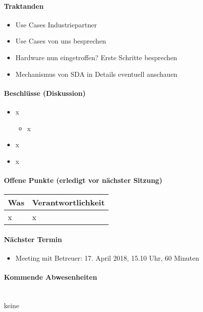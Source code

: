 \paragraph{Traktanden}
\begin{itemize}	
	\item Use Cases Industriepartner
	\item Use Cases von uns besprechen
	\item Hardware nun eingetroffen? Erste Schritte besprechen
	\item Mechanismus von SDA in Details eventuell anschauen
\end{itemize}

\paragraph{Beschlüsse (Diskussion)}
\begin{itemize}	
	\item x
	\begin{itemize}
		\item x
	\end{itemize}
	\item x
	\item x
\end{itemize}

\paragraph{Offene Punkte (erledigt vor nächster Sitzung)} \mbox{}

\begin{table}[H]
	\centering
	\begin{tabularx}{\textwidth}{X | p{4.5cm}}
		\rowcolor{gray!50}
		\textbf{Was} & \textbf{Verantwortlichkeit} \\
		\hline
		x & x \\	
	\end{tabularx}
	\label{tab:my-label}
\end{table}

\paragraph{Nächster Termin}
\begin{itemize}	
	\item Meeting mit Betreuer: 17. April 2018, 15.10 Uhr, 60 Minuten
\end{itemize}

\paragraph{Kommende Abwesenheiten} \mbox{}\\
keine







